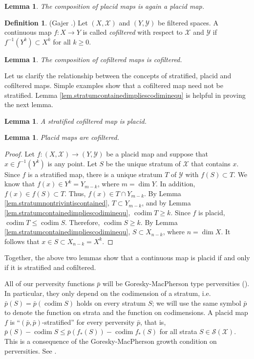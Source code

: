 \documentclass{amsart}
\newtheorem{lemma}[thm]{Lemma}
\theoremstyle{definition}
\newtheorem{defn}[thm]{Definition}
\theoremstyle{remark}
\newcommand {\Sa}    {\ensuremath{\mbox{$\mathcal{S}$}}}
\newcommand {\Xa}    {\ensuremath{\mathcal{X}}}
\newcommand {\Ya}    {\ensuremath{\mathcal{Y}}}
\newcommand {\codim} {\ensuremath{\operatorname{codim}}}
\newcommand {\bp}    {{\ensuremath{\bar{p}}}}
\begin{document}
\begin{lemma} \label{lem.compplacidmapsisplacidmap}
The composition of placid maps is again a placid map.
\end{lemma}

\begin{defn} \label{def.gajercofilteredmap}
(Gajer \cite{gajer}.)
Let $(X,\Xa)$ and  $(Y,\Ya)$ be filtered spaces.
A continuous map $f:X \to Y$ is called 
\emph{cofiltered} with respect to $\Xa$ and $\Ya$ if
$f^{-1} (Y^k) \subset X^k$
for all $k\geq 0$.
\end{defn}

\begin{lemma} \label{lem.compcofilteredmapsiscofiltered}
The composition of cofiltered maps is cofiltered.
\end{lemma}

Let us clarify the relationship between the concepts of
stratified, placid and cofiltered maps. Simple examples show that
a cofiltered map need not be stratified.
Lemma \ref{lem.stratumcontainedimpliescodiminequ}
is helpful in proving the next lemma.
\begin{lemma} \label{lem.stratifiedandcofilteredisplacid}
A stratified cofiltered map is placid.
\end{lemma}

\begin{lemma}
Placid maps are cofiltered.	
\end{lemma}	
\begin{proof}
Let $f:(X,\Xa) \to (Y,\Ya)$ be a placid map and suppose that
$x\in f^{-1} (Y^k)$ is any point.
Let $S$ be the unique stratum of $\Xa$ that contains $x$.
Since $f$ is a stratified map, there is a unique stratum 
$T$ of $\Ya$ with $f(S) \subset T$.
We know that $f(x) \in Y^k = Y_{m-k}$, where $m=\dim Y$.
In addition, $f(x) \in f(S) \subset T$.
Thus, $f(x) \in T\cap Y_{m-k}$.
By Lemma \ref{lem.stratumnontrivintiscontained}, $T \subset Y_{m-k}$, and
by Lemma \ref{lem.stratumcontainedimpliescodiminequ}, $\codim T \geq k$.
Since $f$ is placid, $\codim T \leq \codim S$.
Therefore, $\codim S \geq k$.
By Lemma \ref{lem.stratumcontainedimpliescodiminequ},
$S\subset X_{n-k}$, where $n = \dim X$.
It follows that $x\in S \subset X_{n-k} = X^k$.
\end{proof}
Together, the above two lemmas show that a continuous map is
placid if and only if it is stratified and cofiltered. 

All of our perversity functions $\bp$ will be Goresky-MacPherson type perversities
(\cite{gmih1}). 
In particular, they only depend on the codimension of a stratum, i.e.
$\bp (S) = \bp (\codim S)$ holds on every stratum $S$;
we will use the same symbol $\bp$ to denote the function on strata
and the function on codimensions.
A placid map $f$ is ``$(\bp, \bp)$-stratified'' for every perversity $\bp$, that is,
$\bp (S) - \codim S \leq 
\bp (f_* (S)) - \codim f_* (S)$
for all strata $S \in \Sa (\Xa)$. This is a consequence of 
the Goresky-MacPherson growth condition on perversities.
See \cite[p. 137, Example 4.1.5]{friedmanihbook}.
\end{document}
